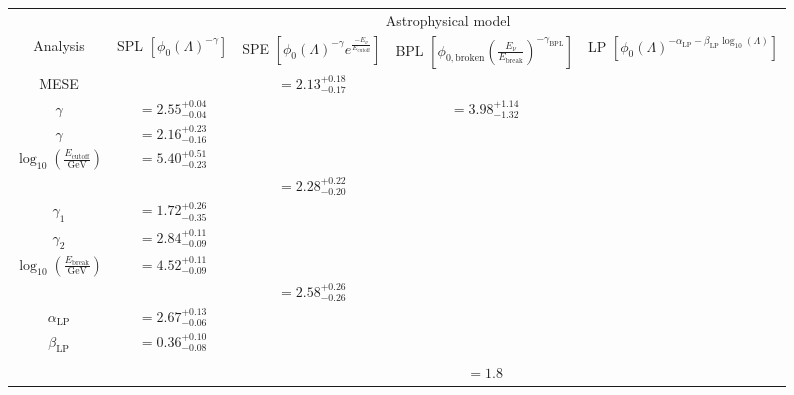 \begin{table}[htbp]
\begin{tabularx}{\linewidth}{c|c|c|c|c}
 & \multicolumn{4}{c}{Astrophysical model} \\ \cline{2-5} 
Analysis & \makecell[tc]{SPL\\$\left[
\phi_0 (\Lambda)^{-\gamma}\right]$ } & 
\makecell[tc]{SPE\\
$\left[
\phi_0 (\Lambda)^{-\gamma} e^{\frac{-E_{\nu}}{E_\mathrm{cutoff}}}\right]$
}
& 
\makecell[tc]{BPL\\$\left[
\phi_{0,\mathrm{broken}}(\frac{E_{\nu}}{E_{\mathrm{break}}})^{-\gamma_{\mathrm{BPL}}}\right]$
}
& 
\makecell[tc]{LP\\
$\left[
\phi_0 (\Lambda)^{-\alpha_\mathrm{LP}-\beta_\mathrm{LP}\log_{10}(\Lambda)
}\right]$
}
 \\ 
\cline{1-5} 
MESE & 
\begin{tabular}[t]{@{} l l @{}}
    $\phi_0$ & $= 2.13^{+0.18}_{-0.17}$ \\
    $\gamma$ & $= 2.55^{+0.04}_{-0.04}$
\end{tabular} & 
\begin{tabular}[t]{@{} l l @{}}
    $\phi_0$ & $= 3.98^{+1.14}_{-1.32}$ \\
    $\gamma$ & $= 2.16^{+0.23}_{-0.16}$ \\
    $\log_{10}(\frac{E_\mathrm{cutoff}}{\mathrm{GeV}})$ & $= 5.40^{+0.51}_{-0.23}$ \\
\end{tabular} & 
\begin{tabular}[t]{@{} l l @{}}
    $\phi_0$ & $= 2.28^{+0.22}_{-0.20}$ \\
    $\gamma_1$ & $= 1.72^{+0.26}_{-0.35}$ \\
    $\gamma_2$ & $= 2.84^{+0.11}_{-0.09}$ \\
    $\log_{10}(\frac{E_\mathrm{break}}{\mathrm{GeV}})$ & $= 4.52^{+0.11}_{-0.09}$ \\
\end{tabular} & 
\begin{tabular}[t]{@{} l l @{}}
    $\phi_0$ & $= 2.58^{+0.26}_{-0.26}$ \\
    $\alpha_\mathrm{LP}$ & $= 2.67^{+0.13}_{-0.06}$ \\
    $\beta_\mathrm{LP}$ & $= 0.36^{+0.10}_{-0.08}$ \\
\end{tabular} \\ \cline{2-5} 
 &
 & 
\begin{tabular}[t]{@{} l l @{}}
$-2 \Delta \mathrm{ln} \mathcal{L}$ & $= 1.8$

\end{tabular}
\end{tabularx}
\end{table}
